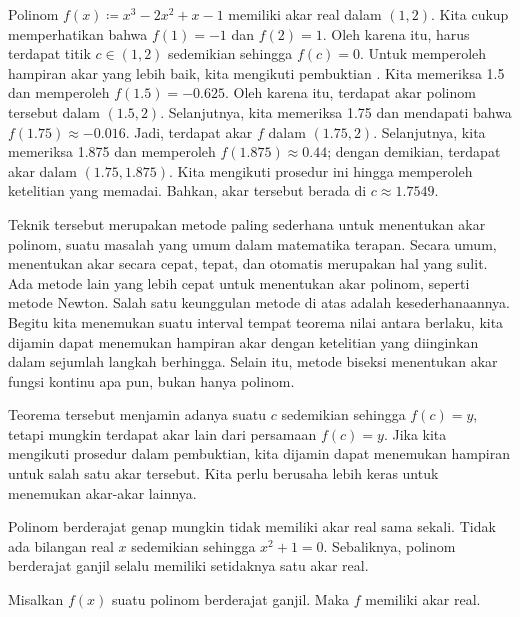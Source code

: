 \begin{example} %
Polinom $f(x) \coloneqq x^3-2x^2+x-1$ memiliki akar real dalam $(1,2)$.  Kita cukup
memperhatikan bahwa $f(1) = -1$ dan $f(2) = 1$.  Oleh karena itu, harus terdapat titik $c
\in (1,2)$ sedemikian sehingga $f(c) = 0$.  Untuk memperoleh hampiran akar yang
lebih baik, kita mengikuti pembuktian .
Kita memeriksa 1.5 dan memperoleh $f(1.5) = -0.625$.  Oleh karena itu,
terdapat akar polinom tersebut dalam $(1.5,2)$.  Selanjutnya, kita memeriksa 1.75
dan mendapati bahwa $f(1.75) \approx -0.016$.  Jadi, terdapat akar $f$ dalam
$(1.75,2)$.  Selanjutnya, kita memeriksa 1.875 dan memperoleh $f(1.875) \approx 0.44$;
dengan demikian, terdapat akar dalam $(1.75,1.875)$.  Kita mengikuti prosedur ini hingga memperoleh
ketelitian yang memadai.  Bahkan, akar tersebut berada di $c \approx 1.7549$.
\end{example}

Teknik tersebut merupakan metode paling sederhana untuk menentukan akar polinom,
suatu masalah yang umum dalam matematika terapan.
Secara umum, menentukan akar secara cepat, tepat,
dan otomatis merupakan hal yang sulit.
Ada metode lain yang lebih cepat untuk menentukan akar polinom, seperti
metode Newton.  Salah satu keunggulan metode di atas adalah
kesederhanaannya.  Begitu kita menemukan suatu interval tempat teorema nilai antara
berlaku, kita dijamin dapat menemukan hampiran akar dengan ketelitian yang
diinginkan dalam sejumlah langkah berhingga.  Selain itu, metode
biseksi menentukan akar fungsi kontinu apa pun,
bukan hanya polinom.

Teorema tersebut menjamin adanya suatu $c$ sedemikian sehingga $f(c) = y$, tetapi
mungkin terdapat akar lain dari persamaan $f(c) = y$.  Jika kita mengikuti
prosedur dalam pembuktian, kita dijamin dapat menemukan hampiran untuk
salah satu akar tersebut.  Kita perlu berusaha lebih keras untuk menemukan akar-akar lainnya.

\medskip

Polinom berderajat genap mungkin tidak memiliki akar real sama sekali.
Tidak ada bilangan real $x$ sedemikian sehingga $x^2+1 = 0$.  Sebaliknya,
polinom berderajat ganjil selalu memiliki setidaknya satu akar real.

\begin{prop}
Misalkan $f(x)$ suatu polinom berderajat ganjil.  Maka $f$ memiliki akar real.
\end{prop}

